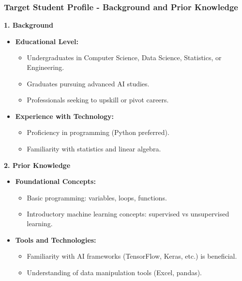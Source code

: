 \documentclass[aspectratio=169]{beamer}
\begin{document}
\begin{frame}[fragile]
    \frametitle{Target Student Profile - Background and Prior Knowledge}
    \textbf{1. Background}
    \begin{itemize}
        \item \textbf{Educational Level:}
        \begin{itemize}
            \item Undergraduates in Computer Science, Data Science, Statistics, or Engineering.
            \item Graduates pursuing advanced AI studies.
            \item Professionals seeking to upskill or pivot careers.
        \end{itemize}
        \item \textbf{Experience with Technology:}
        \begin{itemize}
            \item Proficiency in programming (Python preferred).
            \item Familiarity with statistics and linear algebra.
        \end{itemize}
    \end{itemize}

    \textbf{2. Prior Knowledge}
    \begin{itemize}
        \item \textbf{Foundational Concepts:}
        \begin{itemize}
            \item Basic programming: variables, loops, functions.
            \item Introductory machine learning concepts: supervised vs unsupervised learning.
        \end{itemize}
        \item \textbf{Tools and Technologies:}
        \begin{itemize}
            \item Familiarity with AI frameworks (TensorFlow, Keras, etc.) is beneficial.
            \item Understanding of data manipulation tools (Excel, pandas).
        \end{itemize}
    \end{itemize}
\end{frame}
\end{document}
